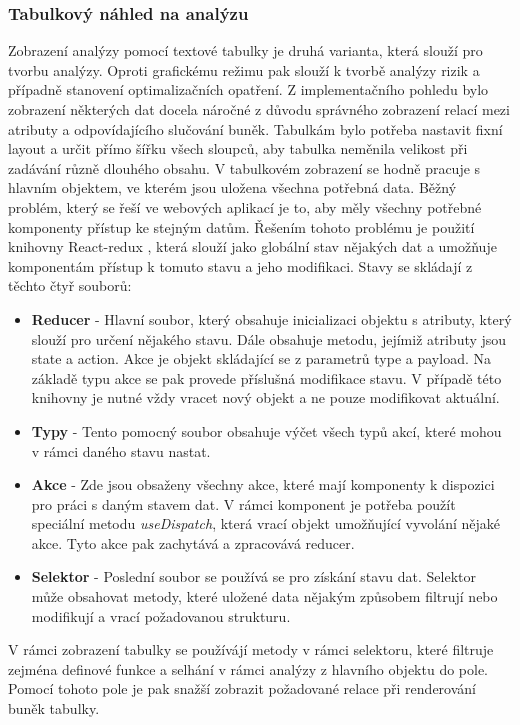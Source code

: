 \subsubsection{Tabulkový náhled na analýzu}
Zobrazení analýzy pomocí textové tabulky je druhá varianta, která slouží pro tvorbu analýzy. Oproti grafickému režimu pak slouží k tvorbě analýzy rizik a případně stanovení optimalizačních opatření. Z implementačního pohledu bylo zobrazení některých dat docela náročné z důvodu správného zobrazení relací mezi atributy a odpovídajícího slučování buněk. Tabulkám bylo potřeba nastavit fixní layout a určit přímo šířku všech sloupců, aby tabulka neměnila velikost při zadávání různě dlouhého obsahu. V tabulkovém zobrazení se hodně pracuje s hlavním objektem, ve kterém jsou uložena všechna potřebná data. Běžný problém, který se řeší ve webových aplikací je to, aby měly všechny potřebné komponenty přístup ke stejným datům. Řešením tohoto problému je použití knihovny React-redux \cite{redux} , která slouží jako globální stav nějakých dat a umožňuje komponentám přístup k tomuto stavu a jeho modifikaci. Stavy se skládají z těchto čtyř souborů: 
\begin{itemize}
    \item \textbf{Reducer} - Hlavní soubor, který obsahuje inicializaci objektu s atributy, který slouží pro určení nějakého stavu. Dále obsahuje metodu, jejímiž atributy jsou state a action. Akce je objekt skládající se z parametrů type a payload. Na základě typu akce se pak provede příslušná modifikace stavu. V případě této knihovny je nutné vždy vracet nový objekt a ne pouze modifikovat aktuální. 
    \item \textbf{Typy} - Tento pomocný soubor obsahuje výčet všech typů akcí, které mohou v rámci daného stavu nastat. 
 \item \textbf{Akce} - Zde jsou obsaženy všechny akce, které mají komponenty k dispozici pro práci s daným stavem dat. V rámci komponent je potřeba použít speciální metodu \textit{useDispatch}, která vrací objekt umožňující vyvolání nějaké akce. Tyto akce pak zachytává a zpracovává reducer. 
 \item \textbf{Selektor} - Poslední soubor se používá se pro získání stavu dat. Selektor může obsahovat metody, které uložené data nějakým způsobem filtrují nebo modifikují a vrací požadovanou strukturu. 
\end{itemize}
V rámci zobrazení tabulky se používájí metody v rámci selektoru, které filtruje zejména definové funkce a selhání v rámci analýzy z hlavního objektu do pole. Pomocí tohoto pole je pak snažší zobrazit požadované relace při renderování buněk tabulky. 

